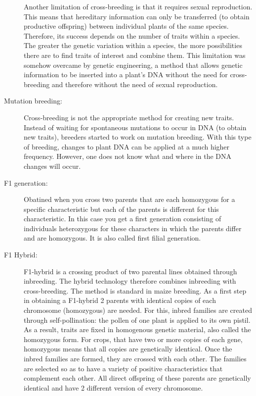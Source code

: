 \documentclass[a4paper,10pt]{article}
\begin{document}
\begin{description}
Another limitation of cross-breeding is that it requires sexual reproduction. This means that hereditary information can only be transferred (to obtain productive offspring) between individual plants of the same species.
Therefore, its success depends on the number of traits within a species. The greater the genetic variation within a species, the more possibilities there are to find traits of interest and combine them.
This limitation was somehow overcame by genetic engineering, a method that allows genetic information to be inserted into a plant’s DNA without the need for cross-breeding and therefore without the need of sexual reproduction.

\item[Mutation breeding:] Cross-breeding is not the appropriate method for creating new traits. 
Instead of waiting for spontaneous mutations to occur in DNA (to obtain new traits), breeders started to work on mutation breeding. 
With this type of breeding, changes to plant DNA can be applied at a much higher frequency. 
However, one does not know what and where in the DNA changes will occur.

\item[F1 generation:] Obatined when you cross two parents that are each homozygous for a specific characteristic but each of the parents is different for this characteristic.
In this case you get a first generation consisting of individuals heterozygous for these characters in which the parents differ and are homozygous. It is also called first filial generation. 

\item[F1 Hybrid:] F1-hybrid is a crossing product of two parental lines obtained through inbreeding. The hybrid technology therefore combines inbreeding with cross-breeding.
The method is standard in maize breeding.
As a first step in obtaining a F1-hybrid 2 parents with identical copies of each chromosome (homozygous) are needed. For this, inbred families are created through self-pollination: the pollen of one plant is applied to its own pistil. 
As a result, traits are fixed in homogenous genetic material, also called the homozygous form. For crops, that have two or more copies of each gene, homozygous means that all copies are genetically identical. 
Once the inbred families are formed, they are crossed with each other. The families are selected so as to have a variety of positive characteristics that complement each other.
All direct offspring of these parents are genetically identical and have 2 different version of every chromosome.


\end{description}
\end{document}

